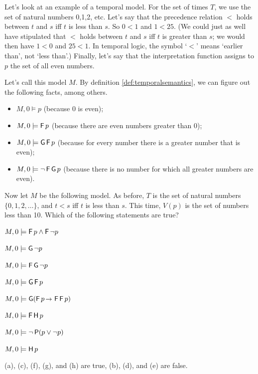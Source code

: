 
Let's look at an example of a temporal model. For the set of times $T$, we use
the set of natural numbers 0,1,2, etc. Let's say that the precedence relation
$<$ holds between $t$ and $s$ iff $t$ is less than $s$. So $0<1$ and
$1 < 25$. (We could just as well have stipulated that $<$ holds between $t$ and
$s$ iff $t$ is greater than $s$; we would then have $1<0$ and $25<1$. In
temporal logic, the symbol `$<$' means `earlier than', not `less than'.)
Finally, let's say that the interpretation function assigns to $p$ the set of
all even numbers.

Let's call this model $M$. By definition \ref{def:temporalsemantics}, we can
figure out the following facts, among others.
\begin{itemize}[leftmargin=10mm]
\itemsep-1mm
\item $M,0 \models p$ (because 0 is even);
\item $M,0 \models \tF p$ (because there are even numbers greater than 0);
\item $M,0 \models \tG\tF p$ (because for every number there is a greater number that is even);
\item $M,0 \models \neg\tF\tG p$ (because there is no number for which all greater numbers are even).
\end{itemize}

\begin{exercise}
  Now let $M$ be the following model. As before, $T$ is the set of natural
  numbers $\{ 0,1,2,\ldots \}$, and $t < s$ iff $t$ is less than $s$. This
  time, $V(p)$ is the set of numbers less than 10. Which of the following
  statements are true?
  \begin{exlist}
  \item $M,0 \models \tF p \land \tF \neg p$ 
  \item $M,0 \models \tG \neg p$
  \item $M,0 \models \tF\tG \neg p$
  \item $M,0 \models \tG\tF p$
  \item $M,0 \models \tG(\tF p \to \tF\tF p)$
  \item $M,0 \models \tF\tH p$
  \item $M,0 \models \neg \tP(p \lor \neg p)$
  \item $M,0 \models \tH p$
  \end{exlist}
\end{exercise}
\begin{solution}
  (a), (c), (f), (g), and (h) are true, (b), (d), and (e) are false. 
\end{solution}

